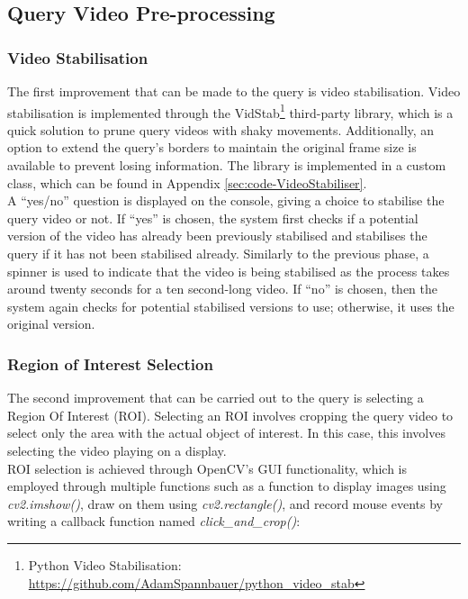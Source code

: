 
\subsection{Query Video Pre-processing}

\subsubsection{Video Stabilisation}

The first improvement that can be made to the query is video stabilisation. Video stabilisation is implemented through the VidStab\footnote{Python Video Stabilisation: \url{https://github.com/AdamSpannbauer/python_video_stab}} third-party library, which is a quick solution to prune query videos with shaky movements. Additionally, an option to extend the query's borders to maintain the original frame size is available to prevent losing information. The library is implemented in a custom class, which can be found in Appendix \ref{sec:code-VideoStabiliser}.\\

A ``yes/no'' question is displayed on the console, giving a choice to stabilise the query video or not. If ``yes'' is chosen, the system first checks if a potential version of the video has already been previously stabilised and stabilises the query if it has not been stabilised already. Similarly to the previous phase, a spinner is used to indicate that the video is being stabilised as the process takes around twenty seconds for a ten second-long video. If ``no'' is chosen, then the system again checks for potential stabilised versions to use; otherwise, it uses the original version.

\subsubsection{Region of Interest Selection}

The second improvement that can be carried out to the query is selecting a Region Of Interest (ROI). Selecting an ROI involves cropping the query video to select only the area with the actual object of interest. In this case, this involves selecting the video playing on a display.\\

ROI selection is achieved through OpenCV's GUI functionality, which is employed through multiple functions such as a function to display images using \textit{cv2.imshow()}, draw on them using \textit{cv2.rectangle()}, and record mouse events by writing a callback function named \textit{click\_and\_crop()}:

